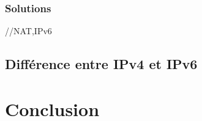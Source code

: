 \documentclass[twoside,openright,a4paper,11pt,french]{article}
\begin{document}
\subsubsection{Solutions}
//NAT,IPv6
\subsection{Différence entre IPv4 et IPv6}

\section{Conclusion}
\label{sec:ccl}



\end{document}
